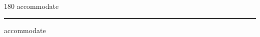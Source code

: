 
\begin{frame}
\begin{center}
\begin{turn}{180}
{\fontsize{2.5cm}{1em}\selectfont accommodate}
\end{turn}
\vspace{1em}\par  
\hrule
\vspace{1em}\par  
{\fontsize{2.5cm}{1em}\selectfont accommodate}
\end{center}
\end{frame}
